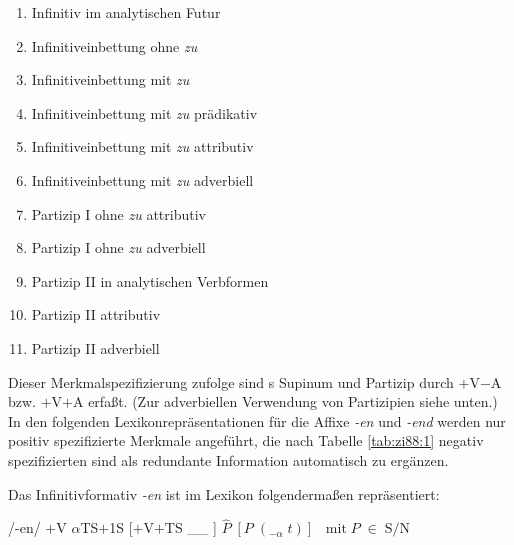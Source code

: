 \documentclass[output=paper,colorlinks,citecolor=brown, booklanguage=german]{langscibook}
\begin{document}
\begin{otherlanguage}{german}
\begin{enumerate}
    \item Infinitiv im analytischen Futur
    \item Infinitiveinbettung ohne \textit{zu}
     \item Infinitiveinbettung mit \textit{zu}
     \item Infinitiveinbettung mit \textit{zu} prädikativ
     \item Infinitiveinbettung mit \textit{zu} attributiv
     \item Infinitiveinbettung mit \textit{zu} adverbiell
     \item Partizip I ohne \textit{zu} attributiv
     \item Partizip I ohne \textit{zu} adverbiell
     \item Partizip II in analytischen Verbformen
     \item Partizip II attributiv   
     \item Partizip II adverbiell
\end{enumerate}

\noindent Dieser Merkmalspezifizierung zufolge sind \citeauthor{Bech1955}s Supinum und Partizip durch $+$V$-$A bzw. $+$V$+$A erfaßt. (Zur adverbiellen Verwendung von Partizipien siehe unten.) In den folgenden Lexikonrepräsentationen für die Affixe \textit{-en} und \textit{-end} werden nur positiv spezifizierte Merkmale angeführt, die nach Tabelle \ref{tab:zi88:1} negativ spezifizierten sind als redundante Information automatisch zu ergänzen.

Das Infinitivformativ \textit{-en} ist im Lexikon folgendermaßen repräsentiert:

\ea\label{ex:zi88:8}
    \ea\label{ex:zi88:8a} /-en/
    \ex\label{ex:zi88:8b} $+$V $\alpha$TS$+$1S
    \ex\label{ex:zi88:8c} [$+$V$+$TS \_\_ ]
    \ex\label{ex:zi88:8d} $\hat{P} \; [P \; (_{-\alpha} \; t)] \;  \;  \; \text{mit} \; P \; \in \; \text{S/N}$
\z\z 


\end{otherlanguage}
\end{document}
